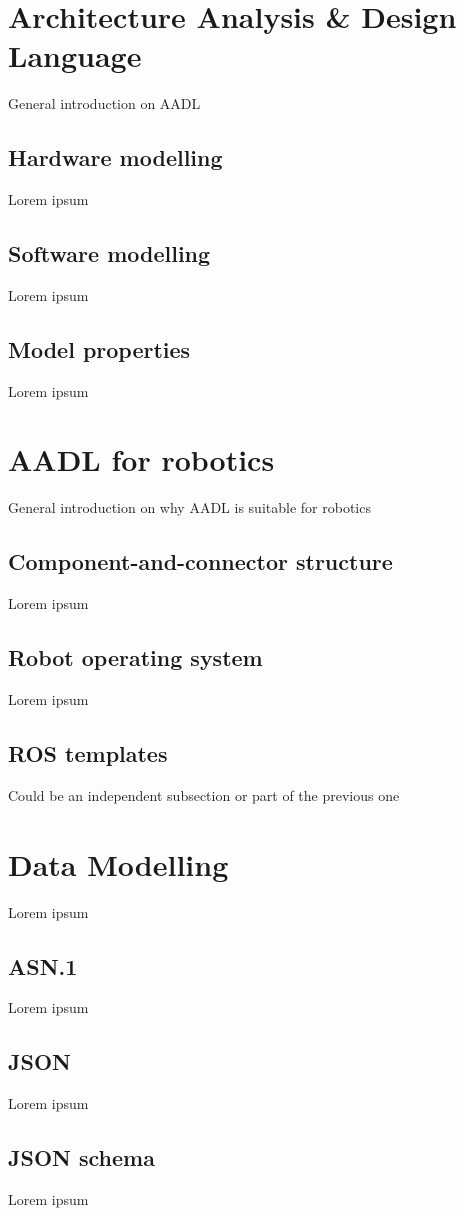 \minitoc
\newpage

\section{Architecture Analysis \& Design Language}
General introduction on AADL

\subsection{Hardware modelling}
Lorem ipsum

\subsection{Software modelling}
Lorem ipsum

\subsection{Model properties}
Lorem ipsum

\section{AADL for robotics}
General introduction on why AADL is suitable for robotics

\subsection{Component-and-connector structure}
Lorem ipsum

\subsection{Robot operating system}
Lorem ipsum

\subsection{ROS templates}
Could be an independent subsection or part of the previous one

\section{Data Modelling}
Lorem ipsum

\subsection{ASN.1}
Lorem ipsum

\subsection{JSON}
Lorem ipsum

\subsection{JSON schema}
Lorem ipsum

